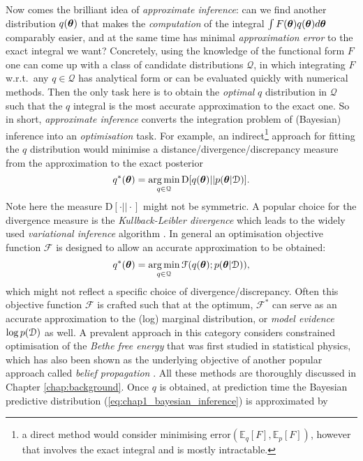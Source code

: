Now comes the brilliant idea of \emph{approximate inference}: can we find another distribution $q(\bm{\theta})$ that makes the \emph{computation} of the integral $\int F(\bm{\theta}) q(\bm{\theta}) d\bm{\theta}$ comparably easier, and at the same time has minimal \emph{approximation error} to the exact integral we want? Concretely, using the knowledge of the functional form $F$ one can come up with a class of candidate distributions $\mathcal{Q}$, in which integrating $F$ w.r.t.~any $q \in \mathcal{Q}$ has analytical form or can be evaluated quickly with numerical methods. Then the only task here is to obtain the \emph{optimal} $q$ distribution in $\mathcal{Q}$ such that the $q$ integral is the most accurate approximation to the exact one. So in short, \emph{approximate inference} converts the integration problem of (Bayesian) inference into an \emph{optimisation} task. For example, an indirect\footnote{a direct method would consider minimising $\text{error}(\mathbb{E}_{q}[F], \mathbb{E}_p[F]) $, however that involves the exact integral and is mostly intractable.} approach for fitting the $q$ distribution would minimise a distance/divergence/discrepancy measure from the approximation to the exact posterior
\begin{equation}
q^*(\bm{\theta}) = \operatorname*{arg\,min}_{q \in \mathcal{Q}} \mathrm{D}[q(\bm{\theta})||p(\bm{\theta}|\mathcal{D})].
\end{equation}
Note here the measure $\mathrm{D}[ \cdot || \cdot ]$ might not be symmetric. A popular choice for the divergence measure is the \emph{Kullback-Leibler divergence} \citep{kullback:divergence1951, kullback:information1959} which leads to the widely used \emph{variational inference} algorithm \citep{jordan:vi1999, ghahramani:variational2000, beal:vi2003}. 
%
In general an optimisation objective function $\mathcal{F}$ is designed to allow an accurate approximation to be obtained:
\begin{equation}
q^*(\bm{\theta}) = \operatorname*{arg\,min}_{q \in \mathcal{Q}} \mathcal{F}(q(\bm{\theta}); p(\bm{\theta}|\mathcal{D})),
\end{equation}
which might not reflect a specific choice of divergence/discrepancy. Often this objective function $\mathcal{F}$ is crafted such that at the optimum, $\mathcal{F}^*$ can serve as an accurate approximation to the (log) marginal distribution, or \emph{model evidence} $\log p(\mathcal{D})$ as well. A prevalent approach in this category considers constrained optimisation of the \emph{Bethe free energy} \citep{bethe:energy1935} that was first studied in statistical physics, which has also been shown as the underlying objective of another popular approach called \emph{belief propagation} \citep{pearl:bp1982}. All these methods are thoroughly discussed in Chapter \ref{chap:background}. Once $q$ is obtained, at prediction time the Bayesian predictive distribution (\ref{eq:chap1_bayesian_inference}) is approximated by 

